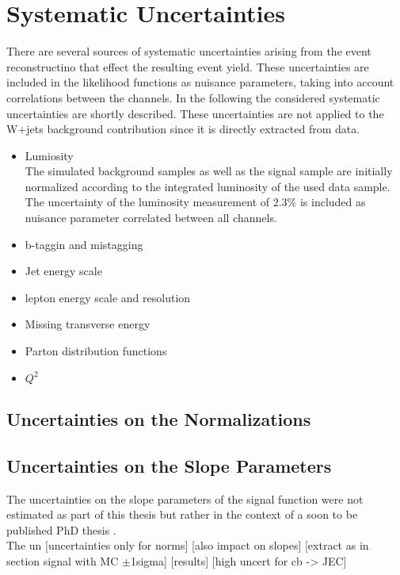 \section{Systematic Uncertainties}
\label{sec:systematics}
There are several sources of systematic uncertainties arising from the event reconstructino that effect the resulting event yield. These uncertainties are included in the likelihood functions as nuisance parameters, taking into account correlations between the channels. In the following the considered systematic uncertainties are shortly described. These uncertainties are not applied to the W+jets background contribution since it is directly extracted from data.
\begin{itemize}
\item Lumiosity\\
The simulated background samples as well as the signal sample are initially normalized according to the integrated luminosity of the used data sample. The uncertainty of the luminosity measurement of $2.3$\% is included as nuisance parameter correlated between all channels.
\item b-taggin and mistagging\\
\item Jet energy scale\\
\item lepton energy scale and resolution\\
\item Missing transverse energy\\
\item Parton distribution functions\\
\item $Q^2$\\
\end{itemize}
\subsection*{Uncertainties on the Normalizations}
\subsection*{Uncertainties on the Slope Parameters}
\label{sec:uncslopesig}
The uncertainties on the slope parameters of the signal function were not estimated as part of this thesis but rather in the context of a soon to be published PhD thesis \cite{IVAN}.\\

\noindent The un
[uncertainties only for norms]
[also impact on slopes]
[extract as in section signal with MC $\pm$1sigma]
[results]
[high uncert for cb -> JEC]



